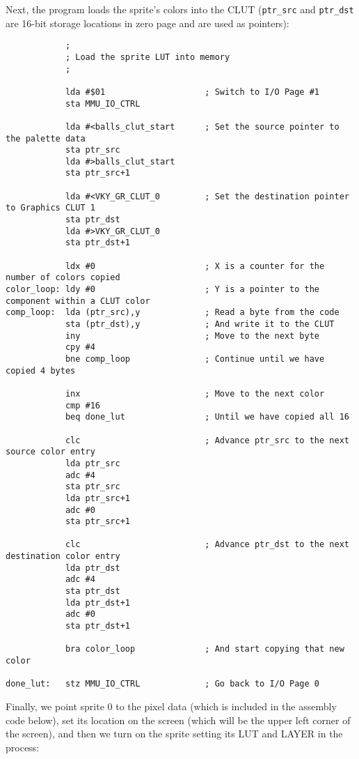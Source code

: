 Next, the program loads the sprite's colors into the CLUT (\verb+ptr_src+ and \verb+ptr_dst+ are 16-bit storage locations in zero page and are used as pointers):

\begin{verbatim}
            ;
            ; Load the sprite LUT into memory
            ;

            lda #$01                    ; Switch to I/O Page #1
            sta MMU_IO_CTRL

            lda #<balls_clut_start      ; Set the source pointer to the palette data
            sta ptr_src
            lda #>balls_clut_start
            sta ptr_src+1

            lda #<VKY_GR_CLUT_0         ; Set the destination pointer to Graphics CLUT 1
            sta ptr_dst
            lda #>VKY_GR_CLUT_0
            sta ptr_dst+1

            ldx #0                      ; X is a counter for the number of colors copied
color_loop: ldy #0                      ; Y is a pointer to the component within a CLUT color
comp_loop:  lda (ptr_src),y             ; Read a byte from the code
            sta (ptr_dst),y             ; And write it to the CLUT
            iny                         ; Move to the next byte
            cpy #4
            bne comp_loop               ; Continue until we have copied 4 bytes

            inx                         ; Move to the next color
            cmp #16
            beq done_lut                ; Until we have copied all 16

            clc                         ; Advance ptr_src to the next source color entry
            lda ptr_src
            adc #4
            sta ptr_src
            lda ptr_src+1
            adc #0
            sta ptr_src+1

            clc                         ; Advance ptr_dst to the next destination color entry
            lda ptr_dst
            adc #4
            sta ptr_dst
            lda ptr_dst+1
            adc #0
            sta ptr_dst+1

            bra color_loop              ; And start copying that new color

done_lut:   stz MMU_IO_CTRL             ; Go back to I/O Page 0
\end{verbatim}

Finally, we point sprite 0 to the pixel data (which is included in the assembly code below), set its location on the screen (which will be the upper left corner of the screen), and then we turn on the sprite setting its LUT and LAYER in the process:

